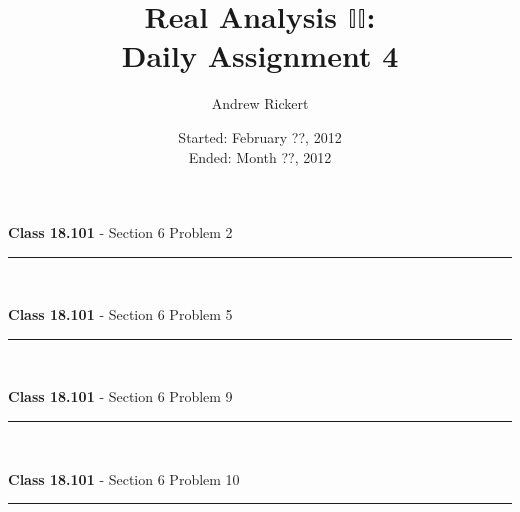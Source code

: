 \documentclass[11pt,reqno]{article}
\title{Real Analysis $\mathbb{II}$: \\ Daily Assignment 4}
\author{Andrew Rickert}
\date{Started: February ??, 2012 \\ \hspace{1pt} Ended: Month ??,  2012}                                           %
\begin{document}
\maketitle

\begin{flushleft} 
\textbf{Class 18.101} - Section 6 Problem 2\\
\rule{500pt}{1pt}\\
\end{flushleft} 



\begin{flushleft} 
\textbf{Class 18.101} - Section 6 Problem 5\\
\rule{500pt}{1pt}\\
\end{flushleft} 



\begin{flushleft} 
\textbf{Class 18.101} - Section 6 Problem 9\\
\rule{500pt}{1pt}\\
\end{flushleft} 



\begin{flushleft} 
\textbf{Class 18.101} - Section 6 Problem 10\\
\rule{500pt}{1pt}\\
\end{flushleft} 
\end{document}
